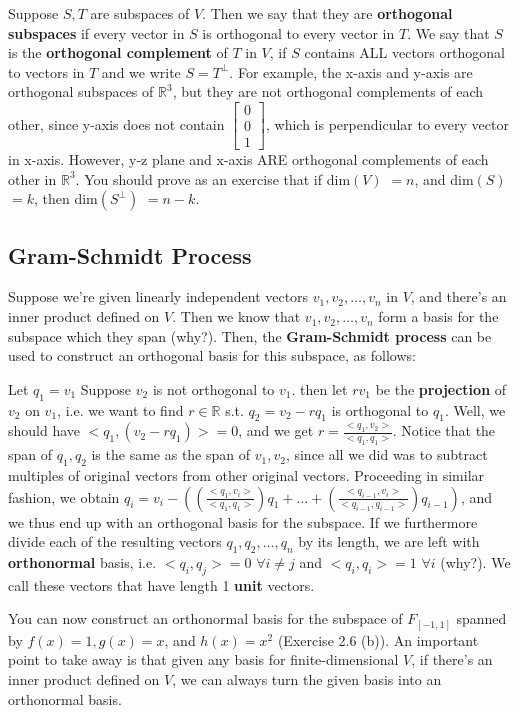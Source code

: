 \documentclass[12pt,oneside]{article}
\begin{document}
Suppose $S, T$ are subspaces of $V$. Then we say that they are
\textbf{orthogonal subspaces} if every vector in $S$ is orthogonal to
every vector in $T$. We say that $S$ is the \textbf{orthogonal
  complement} of $T$ in $V$, if $S$ contains ALL vectors orthogonal to
vectors in $T$ and we write $S = T^\perp$. For example, the x-axis and
y-axis are orthogonal subspaces of ${\mathbb{R}}^3$, but they are not
orthogonal complements of each other, since y-axis does not contain
$\left[ \begin{array} {c}  0 \\ 0 \\ 1 \end{array} \right]$, which is
perpendicular to every vector in x-axis. However, y-z plane and x-axis
ARE orthogonal complements of each other in ${\mathbb{R}}^3$. You
should prove as an exercise that if dim$(V)$ $= n$, and dim$(S)$ $=k$,
then dim$(S^\perp)$ $= n-k$.
\subsection{Gram-Schmidt Process}
Suppose we're given linearly independent vectors $v_{1}, v_{2},
\ldots, v_{n}$ in $V$, and there's an inner product defined on $V$. Then
we know that $v_1, v_2, \ldots, v_n$ form a basis for the subspace
which they span (why?).  Then, the \textbf{Gram-Schmidt process} can be used to construct an orthogonal basis for this subspace, as follows:

Let $q_1 = v_1$ Suppose $v_2$ is not orthogonal
to $v_1$. then let $r v_1$ be the \textbf{projection} of $v_2$ on
$v_1$, i.e. we want to find $r \in \mathbb{R}$ s.t. $q_2 = v_2 - r
q_1$ is orthogonal to $q_1$. Well, we should have $<q_1, (v_2 - r
q_1)> = 0$, and we get $r = \frac{<q_1, v_2>}{<q_1, q_1>}$. Notice
that the span of $q_1, q_2$ is the same as the span of $v_1, v_2$,
since all we did was to subtract multiples of original vectors from
other original vectors. Proceeding in similar fashion, we obtain $q_i = v_i -
\left(\left(\frac{<q_1, v_i>}{<q_1, q_1>}\right) q_1 + \ldots +
  \left(\frac{<q_{i-1}, v_{i}>}{<q_{i-1}, q_{i-1}>}\right)
  q_{i-1}\right)$, and we thus end up with an orthogonal basis for the
subspace. If we furthermore divide each of the resulting vectors $q_1,
q_2, \ldots, q_n$ by its length, we are left with \textbf{orthonormal}
basis, i.e. $<q_i, q_j> = 0$ $\forall i \neq j$ and $<q_i, q_i> = 1$
$\forall i$ (why?). We call these vectors that have length 1
\textbf{unit} vectors.

You can now construct an orthonormal basis for the
subspace of $F_{[-1, 1]}$ spanned by $f(x) = 1, g(x) = x$, and $h(x) =
x^2$ (Exercise 2.6 (b)). An important point to take away is that given any basis for
finite-dimensional $V$, if there's an inner product defined on $V$, we
can always turn the given basis into an orthonormal basis.
\end{document}
